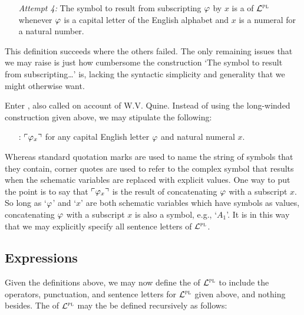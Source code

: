\begin{enumerate}[leftmargin=1.25in, itemsep=-.4em]
  \item[\it Attempt 4:] The symbol to result from subscripting $\varphi$ by $x$ is a  of $\mathcal{L}^{\textsc{pl}}$ whenever $\varphi$ is a capital letter of the English alphabet and $x$ is a numeral for a natural number. 
\end{enumerate}

This definition succeeds where the others failed.
The only remaining issues that we may raise is just how cumbersome the construction `The symbol to result from subscripting\ldots' is, lacking the syntactic simplicity and generality that we might otherwise want.

Enter , also called  on account of W.V. Quine.
Instead of using the long-winded construction given above, we may stipulate the following:

\begin{enumerate}[leftmargin=2.25in, itemsep=-.4em]
  \item[\define{sentence letters}:] $\ulcorner\varphi_x\urcorner$ for any capital English letter $\varphi$ and natural numeral $x$. 
\end{enumerate}

Whereas standard quotation marks are used to name the string of symbols that they contain, corner quotes are used to refer to the complex symbol that results when the schematic variables are replaced with explicit values.
One way to put the point is to say that $\ulcorner\varphi_x\urcorner$ is the result of concatenating $\varphi$ with a subscript $x$.
So long as `$\varphi$' and `$x$' are both schematic variables which have symbols as values, concatenating $\varphi$ with a subscript $x$ is also a symbol, e.g., `$A_1$'.
It is in this way that we may explicitly specify all sentence letters of $\mathcal{L}^{\textsc{pl}}$.





\subsection{Expressions}%
  \label{sub.expressions}

Given the definitions above, we may now define the  of $\mathcal{L}^{\textsc{pl}}$ to include the operators, punctuation, and sentence letters for $\mathcal{L}^{\textsc{pl}}$ given above, and nothing besides.
The  of $\mathcal{L}^{\textsc{pl}}$ may the be defined recursively as follows: 
  
